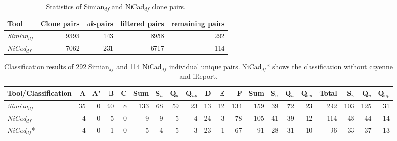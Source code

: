\documentclass{IEEEtran}
\begin{document}

\begin{table}[H]
	\centering
	\caption{Statistics of Simian$_{df}$ and NiCad$_{df}$ clone pairs.}
	\label{tab:classification_indv_stats}
	\begin{tabular}{l|r|r|r|r}
		\hline 
		Tool & Clone pairs & \textit{ok}-pairs & filtered pairs & remaining pairs \\ 
		\hline 
		\multirow{1}{*}{\textit{Simian$_{df}$}} & 9393 & 143 & 8958 & 292 \\
		\hline
		\multirow{1}{*}{\textit{NiCad$_{df}$}} & 7062  & 231 & 6717 & 114 \\
		\hline
	\end{tabular} 
\end{table}

\begin{table}[H]
	\centering
	\caption{Classification results of 292 Simian$_{df}$ and 114 NiCad$_{df}$ individual unique pairs. NiCad$_{df}$* shows the classification without cayenne and iReport.}
	\label{tab:classification_indv}
	\begin{tabular}{|l|r|r|r|r|r|r|r|r|r|r|r|r|r|r|r|r|r|r|r|}
		\hline 
		Tool/Classification & A & A' & B & C & Sum & S$_{u}$ & Q$_{u}$ & Q$_{up}$ & D & E & F & Sum  & S$_{u}$ & Q$_{u}$ & Q$_{up}$ & Total & S$_{u}$ & Q$_{u}$  & Q$_{up}$  \\ 
		\hline 
		\multirow{1}{*}{\textit{Simian$_{df}$}} & 35 & 0 & 90 & 8 & 133 & 68 & 59 & 23 & 13 & 12 & 134 & 159 & 39 & 72 & 23 & 292 & 103 & 125 & 31 \\
		\hline
		\multirow{1}{*}{\textit{NiCad$_{df}$}} & 4  & 0 & 5 & 0 & 9 & 9 & 5 & 4 & 24 & 3 & 78 & 105 & 41 & 39 & 12 & 114 & 48 & 44 & 14 \\ 
		\hline
		\multirow{1}{*}{\textit{NiCad$_{df}$}*} & 4  & 0 & 1 & 0 & 5 & 4 & 5 & 3 & 23 & 1 & 67 & 91 & 28 & 31 & 10 & 96 & 33 & 37 & 13 \\ 
		\hline
	\end{tabular} 
\end{table}
\end{document}
